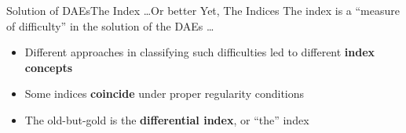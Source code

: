 \begin{frame}{Solution of \aclp{DAE}}{The Index \dots Or better Yet, The Indices}
  The index is a ``measure of difficulty'' in the solution of the \acsp{DAE} \dots
  \begin{itemize}[<+->]
    \item Different approaches in classifying such difficulties led to different \textbf{index concepts} \\
    \item Some indices \textbf{coincide} under proper regularity conditions
    \item The old-but-gold is the \textbf{differential index}, or ``the'' index
  \end{itemize}
  \vspace{0.5em}
\end{frame}

